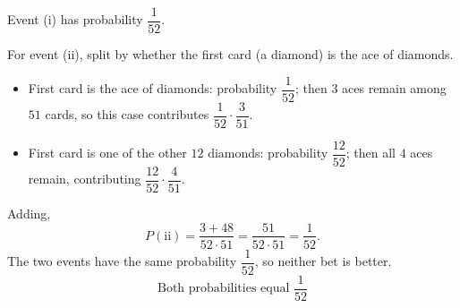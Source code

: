 Event (i) has probability \(\dfrac{1}{52}\).

For event (ii), split by whether the first card (a diamond) is the ace of diamonds.
\begin{itemize}
\item First card is the ace of diamonds: probability \(\dfrac{1}{52}\); then \(3\) aces remain among \(51\) cards, so this case contributes \(\dfrac{1}{52}\cdot\dfrac{3}{51}\).
\item First card is one of the other \(12\) diamonds: probability \(\dfrac{12}{52}\); then all \(4\) aces remain, contributing \(\dfrac{12}{52}\cdot\dfrac{4}{51}\).
\end{itemize}
Adding,
\[
P(\text{ii})=\dfrac{3+48}{52\cdot 51}=\dfrac{51}{52\cdot 51}=\dfrac{1}{52}.
\]
The two events have the same probability \(\dfrac{1}{52}\), so neither bet is better.
\[
\boxed{\text{Both probabilities equal }\dfrac{1}{52}}
\]
